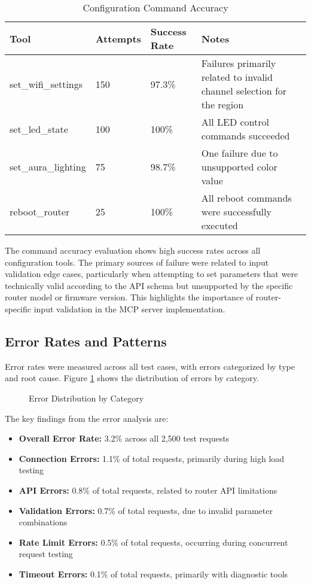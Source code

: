 \begin{table}[htbp]
\caption{Configuration Command Accuracy}
\label{tab:command-accuracy}
\begin{tabular}{|p{3.5cm}|p{3cm}|p{3cm}|p{5cm}|}
\hline
\textbf{Tool} & \textbf{Attempts} & \textbf{Success Rate} & \textbf{Notes} \\ \hline
set\_wifi\_settings & 150 & 97.3\% & Failures primarily related to invalid channel selection for the region \\ \hline
set\_led\_state & 100 & 100\% & All LED control commands succeeded \\ \hline
set\_aura\_lighting & 75 & 98.7\% & One failure due to unsupported color value \\ \hline
reboot\_router & 25 & 100\% & All reboot commands were successfully executed \\ \hline
\end{tabular}
\end{table}

The command accuracy evaluation shows high success rates across all configuration tools. The primary sources of failure were related to input validation edge cases, particularly when attempting to set parameters that were technically valid according to the API schema but unsupported by the specific router model or firmware version. This highlights the importance of router-specific input validation in the MCP server implementation.

\subsection{Error Rates and Patterns}
Error rates were measured across all test cases, with errors categorized by type and root cause. Figure \ref{fig:error-rates} shows the distribution of errors by category.

\begin{figure}[h]
\centering
\caption{Error Distribution by Category}
\label{fig:error-rates}
\end{figure}

The key findings from the error analysis are:

\begin{itemize}
\item \textbf{Overall Error Rate:} 3.2\% across all 2,500 test requests
\item \textbf{Connection Errors:} 1.1\% of total requests, primarily during high load testing
\item \textbf{API Errors:} 0.8\% of total requests, related to router API limitations
\item \textbf{Validation Errors:} 0.7\% of total requests, due to invalid parameter combinations
\item \textbf{Rate Limit Errors:} 0.5\% of total requests, occurring during concurrent request testing
\item \textbf{Timeout Errors:} 0.1\% of total requests, primarily with diagnostic tools
\end{itemize}

